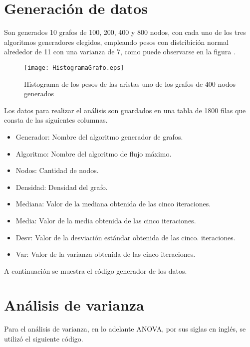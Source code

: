 \documentclass{article}
\begin{document}
\section*{Generación de datos}

Son generados 10 grafos de 100, 200, 400 y 800 nodos, con cada uno de los tres algoritmos generadores elegidos, empleando pesos con distribición normal alrededor de 11 con una varianza de 7, como puede observarse en la figura \pageref{Figura 1}.

\begin{figure}
\begin{center}
  \texttt{[image: HistogramaGrafo.eps]}
\end{center}
\vspace*{-8mm}
\caption{Histograma de los pesos de las aristas uno de los grafos de 400 nodos generados}
  \label{Figura 1} 
\end{figure}

Los datos para realizar el análisis son guardados en una tabla de 1800 filas que consta de las siguientes columnas.

\begin{itemize}
\item Generador: Nombre del algoritmo generador de grafos.	
\item Algoritmo: Nombre del algoritmo de flujo máximo.	
\item Nodos: Cantidad de nodos.	
\item Densidad: Densidad del grafo.
\item Mediana: Valor de la mediana obtenida de las cinco iteraciones.	
\item Media: Valor de la media obtenida de las cinco iteraciones.	
\item Desv: Valor de la desviación estándar obtenida de las cinco. iteraciones.
\item Var: Valor de la varianza obtenida de las cinco iteraciones.	
\end{itemize}

A continuación se muestra el código generador de los datos.

 

\section*{Análisis de varianza}

Para el análisis de varianza, en lo adelante ANOVA, por sus siglas en inglés\citep{anova}, se utilizó el siguiente código.
\end{document}
